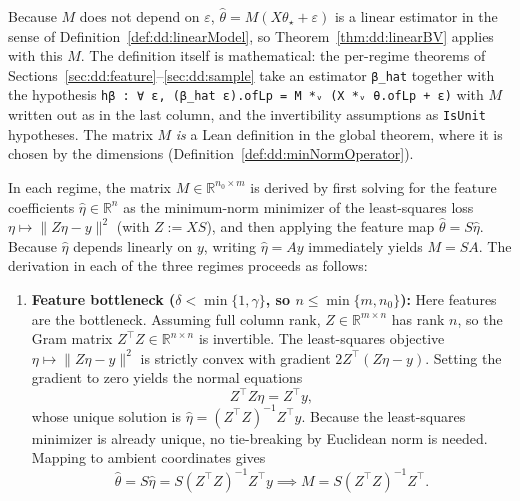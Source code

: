 \begin{definition}
Because $M$ does not depend on $\varepsilon$, $\hat\theta=M(X\theta_\star+\varepsilon)$ is a linear estimator in the sense of Definition~\ref{def:dd:linearModel}, so Theorem~\ref{thm:dd:linearBV} applies with this $M$. The definition itself is mathematical: the per-regime theorems of Sections~\ref{sec:dd:feature}--\ref{sec:dd:sample} take an estimator \texttt{β\_hat} together with the hypothesis \texttt{hβ : ∀ ε, (β\_hat ε).ofLp = M *ᵥ (X *ᵥ θ.ofLp + ε)} with $M$ written out as in the last column, and the invertibility assumptions as \texttt{IsUnit} hypotheses.
The matrix $M$ \emph{is} a Lean definition in the global theorem, where it is chosen by the dimensions (Definition~\ref{def:dd:minNormOperator}).
\end{definition}

\begin{remark}\label{rmk:dd:derivationOfM}
In each regime, the matrix $M\in\mathbb R^{n_0\times m}$ is derived by first solving for the feature coefficients $\hat\eta\in\mathbb R^n$ as the minimum-norm minimizer of the least-squares loss $\eta\mapsto\|Z\eta-y\|^2$ (with $Z:=XS$), and then applying the feature map $\hat\theta=S\hat\eta$. Because $\hat\eta$ depends linearly on $y$, writing $\hat\eta=Ay$ immediately yields $M=SA$. The derivation in each of the three regimes proceeds as follows:
\begin{enumerate}
  \item \textbf{Feature bottleneck ($\delta<\min\{1,\gamma\}$, so $n\le\min\{m,n_0\}$):}
  Here features are the bottleneck. Assuming full column rank, $Z\in\mathbb R^{m\times n}$ has rank $n$, so the Gram matrix $Z^\top Z\in\mathbb R^{n\times n}$ is invertible.
  The least-squares objective $\eta\mapsto\|Z\eta-y\|^2$ is strictly convex with gradient $2Z^\top(Z\eta-y)$. Setting the gradient to zero yields the normal equations
  \[
    Z^\top Z\eta = Z^\top y,
  \]
  whose unique solution is $\hat\eta=(Z^\top Z)^{-1}Z^\top y$. Because the least-squares minimizer is already unique, no tie-breaking by Euclidean norm is needed. Mapping to ambient coordinates gives
  \[
    \hat\theta = S\hat\eta = S(Z^\top Z)^{-1}Z^\top y \implies M = S(Z^\top Z)^{-1}Z^\top.
  \]


\end{enumerate}
\end{remark}
